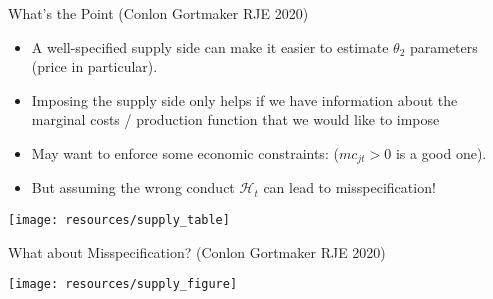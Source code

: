 \begin{frame}{What's the Point (Conlon Gortmaker RJE 2020)}
\begin{itemize}
\item A well-specified supply side can make it easier to estimate $\theta_2$ parameters (price in particular).
\item Imposing the supply side only helps if we have information about the marginal costs / production function that we would like to impose
\item May want to enforce some economic constraints: ($mc_{jt} > 0$ is a good one).
\item But assuming the wrong conduct $\mathcal{H}_t$ can lead to misspecification!
\end{itemize}
\begin{center}
\texttt{[image: resources/supply\_table]}
\end{center}
\end{frame}



\begin{frame}{What about Misspecification? (Conlon Gortmaker RJE 2020)}
\begin{center}
\texttt{[image: resources/supply\_figure]}
\end{center}
\end{frame}

%
%
%
%
%

